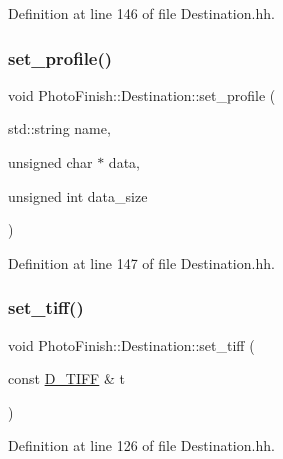 Definition at line 146 of file Destination.\+hh.

\mbox{\label{class_photo_finish_1_1_destination_a05f4da975f2b1bc18eece0e50c01d45f}} 
\subsubsection{\texorpdfstring{set\+\_\+profile()}{set\_profile()}\hspace{0.1cm}{\footnotesize\ttfamily [2/2]}}
{\footnotesize\ttfamily void Photo\+Finish\+::\+Destination\+::set\+\_\+profile (\begin{DoxyParamCaption}\item[{std\+::string}]{name,  }\item[{unsigned char $\ast$}]{data,  }\item[{unsigned int}]{data\+\_\+size }\end{DoxyParamCaption})\hspace{0.3cm}{\ttfamily [inline]}}



Definition at line 147 of file Destination.\+hh.

\mbox{\label{class_photo_finish_1_1_destination_ad594b4d9178266e83f1e189f24febe1f}} 
\subsubsection{\texorpdfstring{set\+\_\+tiff()}{set\_tiff()}}
{\footnotesize\ttfamily void Photo\+Finish\+::\+Destination\+::set\+\_\+tiff (\begin{DoxyParamCaption}\item[{const \hyperlink{class_photo_finish_1_1_d___t_i_f_f}{D\+\_\+\+T\+I\+FF} \&}]{t }\end{DoxyParamCaption})\hspace{0.3cm}{\ttfamily [inline]}}



Definition at line 126 of file Destination.\+hh.

